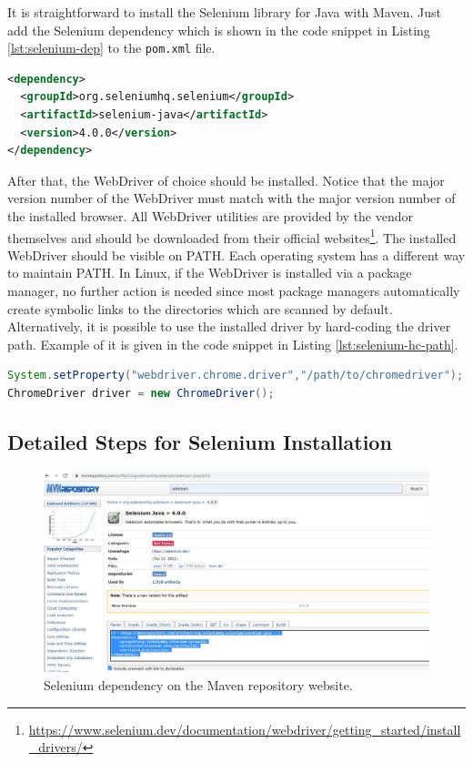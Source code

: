 It is straightforward to install the Selenium library for Java with Maven. Just add the Selenium dependency which is shown in the code snippet in Listing \ref{lst:selenium-dep} to the \lstinline[language={}]!pom.xml! file.

\begin{lstlisting}[language=XML,caption={The Selenium dependency for Maven.},label=lst:selenium-dep]
<dependency>
  <groupId>org.seleniumhq.selenium</groupId>
  <artifactId>selenium-java</artifactId>
  <version>4.0.0</version>
</dependency>
\end{lstlisting}

After that, the WebDriver of choice should be installed. Notice that the major version number of the WebDriver must match with the major version number of the installed browser. All WebDriver utilities are provided by the vendor themselves and should be downloaded from their official websites\footnote{\url{https://www.selenium.dev/documentation/webdriver/getting\_started/install\_drivers/}}. The installed WebDriver should be visible on PATH. Each operating system has a different way to maintain PATH. In Linux, if the WebDriver is installed via a package manager, no further action is needed since most package managers automatically create symbolic links to the directories which are scanned by default. Alternatively, it is possible to use the installed driver by hard-coding the driver path. Example of it is given in the code snippet in Listing \ref{lst:selenium-hc-path}.

\begin{lstlisting}[language=java,caption={Using the driver from a hard-coded path.},label=lst:selenium-hc-path]
System.setProperty("webdriver.chrome.driver","/path/to/chromedriver");
ChromeDriver driver = new ChromeDriver();
\end{lstlisting}

\subsection{Detailed Steps for Selenium Installation}

\begin{figure}
    \includegraphics{images/selenium1-detailed-install-1.jpg}
    \caption{Selenium dependency on the Maven repository website.}
\end{figure}


